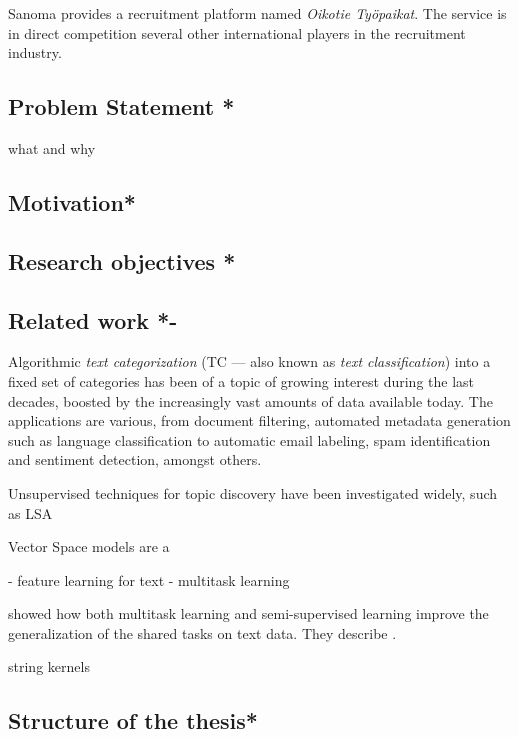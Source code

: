 Sanoma provides a recruitment platform named \emph{Oikotie Työpaikat}. The service is in direct competition several other international players in the recruitment industry.

\subsection{Problem Statement *}

what and why

\subsection{Motivation*}



\subsection{Research objectives *}

\subsection{Related work *-}


Algorithmic \emph{text categorization} (TC --- also known as \emph{text classification}) into a fixed set of categories has been of a topic of growing interest during the last decades, boosted by the increasingly vast amounts of data available today. The applications are various, from document filtering, automated metadata generation such as language classification to automatic email labeling, spam identification and sentiment detection, amongst others.

Unsupervised techniques for topic discovery have been investigated widely, such as LSA

Vector Space models are a

- feature learning for text
- multitask learning


\cite{Collobert:2008aa} showed how both multitask learning and semi-supervised learning improve the generalization of the shared tasks on text data. They describe .

\cite{Lodhi:2002aa} string kernels



\subsection{Structure of the thesis*}
